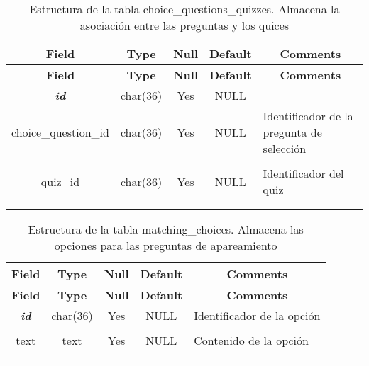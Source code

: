 %
%
\begin{longtable}{c c c c l}
	\multicolumn{1}{c}{\textbf{Field}} &
	\multicolumn{1}{c}{\textbf{Type}} &
	\multicolumn{1}{c}{\textbf{Null}} &
	\multicolumn{1}{c}{\textbf{Default}} &
	\multicolumn{1}{c}{\textbf{Comments}} \\ \hline \hline
\endfirsthead
	\multicolumn{1}{c}{\textbf{Field}} &
	\multicolumn{1}{c}{\textbf{Type}} &
	\multicolumn{1}{c}{\textbf{Null}} &
	\multicolumn{1}{c}{\textbf{Default}} &
	\multicolumn{1}{c}{\textbf{Comments}} \\ \hline \hline
\endhead \endfoot
	\textbf{\textit{id}} & char(36) & Yes & NULL \\ \hline 
	choice\_question\_id & char(36) & Yes & NULL & \parbox[t]{0.35\textwidth}{Identificador de la pregunta de selección} \\ \\  \hline
	quiz\_id & char(36) & Yes & NULL & \parbox[t]{0.35\textwidth}{Identificador del quiz} \\ \\
\caption[Estructura de la tabla choice\_questions\_quizzes]{Estructura de la tabla choice\_questions\_quizzes. Almacena la asociación entre las preguntas y los quices} \label{tab:quiz_choice_questions_quizzes-structure} \\
\end{longtable}

%
%
\begin{longtable}{c c c c l}
	\multicolumn{1}{c}{\textbf{Field}} &
	\multicolumn{1}{c}{\textbf{Type}} &
	\multicolumn{1}{c}{\textbf{Null}} &
	\multicolumn{1}{c}{\textbf{Default}} &
	\multicolumn{1}{c}{\textbf{Comments}} \\ \hline \hline
\endfirsthead
	\multicolumn{1}{c}{\textbf{Field}} &
	\multicolumn{1}{c}{\textbf{Type}} &
	\multicolumn{1}{c}{\textbf{Null}} &
	\multicolumn{1}{c}{\textbf{Default}} &
	\multicolumn{1}{c}{\textbf{Comments}} \\ \hline \hline
\endhead \endfoot
	\textbf{\textit{id}} & char(36) & Yes & NULL & \parbox[t]{0.35\textwidth}{Identificador de la opción} \\ \\  \hline
	text & text & Yes & NULL  & \parbox[t]{0.35\textwidth}{Contenido de la opción} \\ \\
\caption[Estructura de la tabla matching\_choices]{Estructura de la tabla matching\_choices. Almacena las opciones para las preguntas de apareamiento} \label{tab:quiz_matching_choices-structure} \\
\end{longtable}


